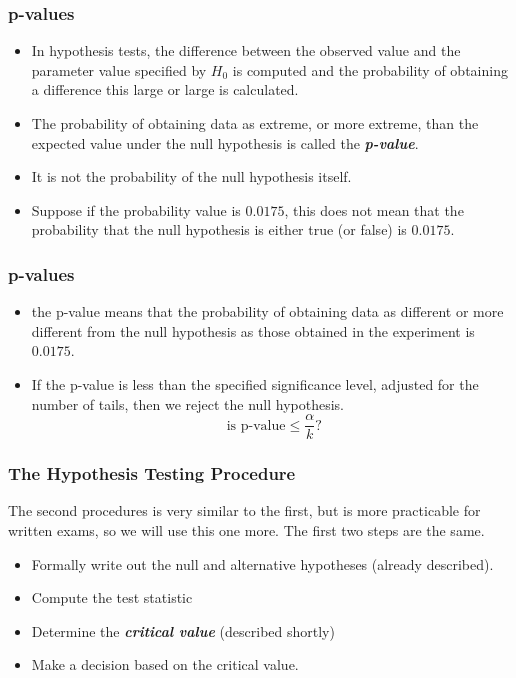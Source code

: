 ﻿\documentclass[a4]{beamer}
\begin{document}
\begin{frame}
\frametitle{p-values}
\begin{itemize}
\item In hypothesis tests, the difference between the observed value and the parameter value specified by $H_0$ is computed and the probability of obtaining a difference this large or large is calculated.
\item The probability of obtaining data as extreme, or more extreme, than the expected value under the null hypothesis is called the \textbf{\emph{p-value}}.
\item It is not the probability of the null hypothesis itself.
\item Suppose if the probability value is $0.0175$, this does not mean that the probability that the null hypothesis is either true (or false) is $0.0175$.

\end{itemize}
\end{frame}
\begin{frame}
\frametitle{p-values}
\begin{itemize}
\item the p-value means that the probability of obtaining data as different or more different from the null hypothesis as those obtained in the experiment is $0.0175$.
\item If the p-value is less than the specified significance level, adjusted for the number of tails, then we reject the null hypothesis.
\[\mbox{ is p-value} \leq \frac{\alpha}{k} \mbox{?}\]
\end{itemize}
\end{frame}

\begin{frame}
\frametitle{The Hypothesis Testing Procedure }
The second procedures is very similar to the first, but is more practicable for written exams, so we will use this one more. The first two steps are the same.

\begin{itemize}
\item Formally write out the null and alternative hypotheses (already described).
\item Compute the test statistic
\item Determine the \emph{\textbf{critical value}} (described shortly)
\item Make a decision based on the critical value.
\end{itemize}
\end{frame}
\end{document}
